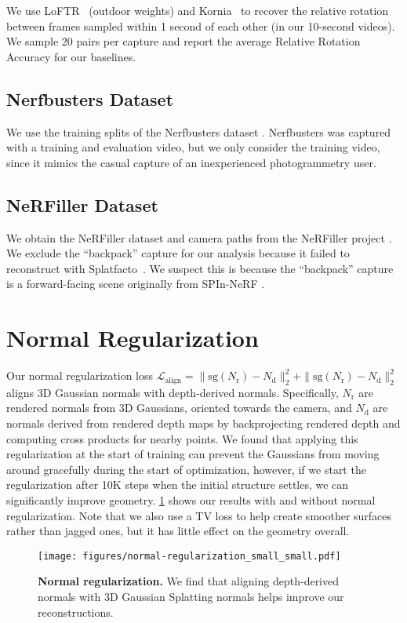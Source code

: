 We use LoFTR~\cite{sun2021loftr} (outdoor weights) and Kornia~\cite{riba2020kornia} to recover the relative rotation between frames sampled within 1 second of each other (in our 10-second videos).
We sample 20 pairs per capture and report the average Relative Rotation Accuracy for our baselines.


\subsection{Nerfbusters Dataset}

We use the training splits of the Nerfbusters dataset \cite{weber2024nerfiller}.
Nerfbusters was captured with a training and evaluation video, but we only consider the training video, since it mimics the casual capture of an inexperienced photogrammetry user.


\subsection{NeRFiller Dataset}

We obtain the NeRFiller dataset and camera paths from the NeRFiller project \cite{weber2024nerfiller}.
We exclude the ``backpack'' capture for our analysis because it failed to reconstruct with Splatfacto~\cite{tancik2023nerfstudio,ye2024gsplat}. We suspect this is because the ``backpack'' capture is a forward-facing scene originally from SPIn-NeRF \cite{mirzaei2023spin}.


\section{Normal Regularization}

Our normal regularization loss $\mathcal{L}_\text{align} = \|\mathrm{sg}(N_\text{r}) - N_\text{d}\|^{2}_{2} + \|\mathrm{sg}(N_\text{r}) - N_\text{d}\|^{2}_{2}$ aligns 3D Gaussian normals with depth-derived normals. Specifically, $N_\text{r}$ are rendered normals from 3D Gaussians, oriented towards the camera, and $N_\text{d}$ are normals derived from rendered depth maps by backprojecting rendered depth and computing cross products for nearby points. We found that applying this regularization at the start of training can prevent the Gaussians from moving around gracefully during the start of optimization, however, if we start the regularization after 10K steps when the initial structure settles, we can significantly improve geometry. \cref{fig:normal_regularization} shows our results with and without normal regularization.
Note that we also use a TV loss to help create smoother surfaces rather than jagged ones, but it has little effect on the geometry overall.

\begin{figure}[H]
\centering
\texttt{[image: figures/normal-regularization\_small\_small.pdf]}
\caption{\textbf{Normal regularization.} We find that aligning depth-derived normals with 3D Gaussian Splatting normals helps improve our reconstructions.}
\label{fig:normal_regularization}
\end{figure}